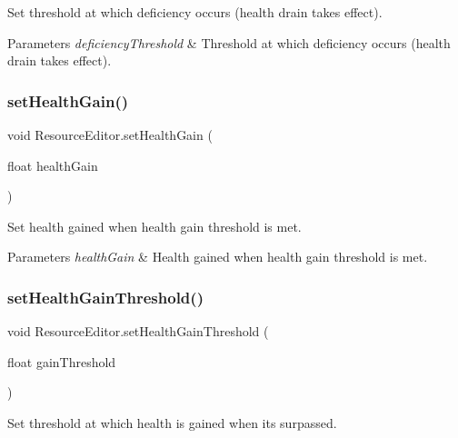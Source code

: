 Set threshold at which deficiency occurs (health drain takes effect). 


\begin{DoxyParams}{Parameters}
{\em deficiency\+Threshold} & Threshold at which deficiency occurs (health drain takes effect).\\
\hline
\end{DoxyParams}
\mbox{\label{class_resource_editor_a4865f27f5f791455a7c4aa885be706a8}} 
\subsubsection{\texorpdfstring{set\+Health\+Gain()}{setHealthGain()}}
{\footnotesize\ttfamily void Resource\+Editor.\+set\+Health\+Gain (\begin{DoxyParamCaption}\item[{float}]{health\+Gain }\end{DoxyParamCaption})}



Set health gained when health gain threshold is met. 


\begin{DoxyParams}{Parameters}
{\em health\+Gain} & Health gained when health gain threshold is met.\\
\hline
\end{DoxyParams}
\mbox{\label{class_resource_editor_ac3d8fea68de6b8141fa6c777bb192590}} 
\subsubsection{\texorpdfstring{set\+Health\+Gain\+Threshold()}{setHealthGainThreshold()}}
{\footnotesize\ttfamily void Resource\+Editor.\+set\+Health\+Gain\+Threshold (\begin{DoxyParamCaption}\item[{float}]{gain\+Threshold }\end{DoxyParamCaption})}



Set threshold at which health is gained when it\textquotesingle{}s surpassed. 


